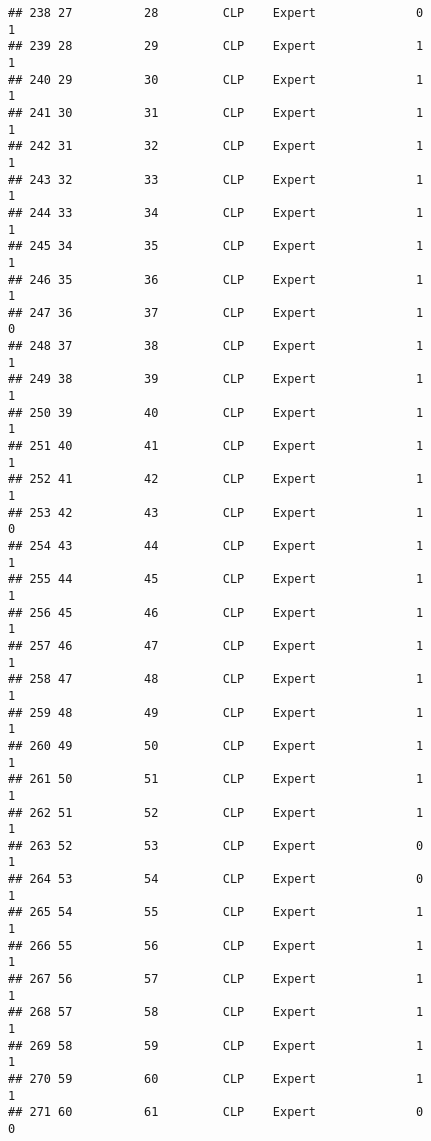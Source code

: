 \documentclass[
]{article}
\begin{document}
\begin{verbatim}
## 238 27          28         CLP    Expert              0                 1
## 239 28          29         CLP    Expert              1                 1
## 240 29          30         CLP    Expert              1                 1
## 241 30          31         CLP    Expert              1                 1
## 242 31          32         CLP    Expert              1                 1
## 243 32          33         CLP    Expert              1                 1
## 244 33          34         CLP    Expert              1                 1
## 245 34          35         CLP    Expert              1                 1
## 246 35          36         CLP    Expert              1                 1
## 247 36          37         CLP    Expert              1                 0
## 248 37          38         CLP    Expert              1                 1
## 249 38          39         CLP    Expert              1                 1
## 250 39          40         CLP    Expert              1                 1
## 251 40          41         CLP    Expert              1                 1
## 252 41          42         CLP    Expert              1                 1
## 253 42          43         CLP    Expert              1                 0
## 254 43          44         CLP    Expert              1                 1
## 255 44          45         CLP    Expert              1                 1
## 256 45          46         CLP    Expert              1                 1
## 257 46          47         CLP    Expert              1                 1
## 258 47          48         CLP    Expert              1                 1
## 259 48          49         CLP    Expert              1                 1
## 260 49          50         CLP    Expert              1                 1
## 261 50          51         CLP    Expert              1                 1
## 262 51          52         CLP    Expert              1                 1
## 263 52          53         CLP    Expert              0                 1
## 264 53          54         CLP    Expert              0                 1
## 265 54          55         CLP    Expert              1                 1
## 266 55          56         CLP    Expert              1                 1
## 267 56          57         CLP    Expert              1                 1
## 268 57          58         CLP    Expert              1                 1
## 269 58          59         CLP    Expert              1                 1
## 270 59          60         CLP    Expert              1                 1
## 271 60          61         CLP    Expert              0                 0

\end{verbatim}
\end{document}
